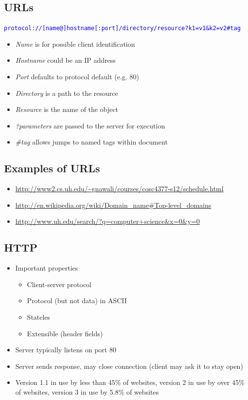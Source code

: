 \subsection{URLs}
\textcolor{blue}{\texttt{protocol://[name@]hostname[:port]/directory/resource?k1=v1\&k2=v2\#tag}}
\begin{itemize}[nosep]
    \item \emph{Name} is for possible client identification
    \item \emph{Hostname} could be an IP address
    \item \emph{Port} defaults to protocol default (e.g. 80)
    \item \emph{Directory} is a path to the resource
    \item \emph{Resource} is the name of the object
    \item \emph{?parameters} are passed to the server for execution
    \item \emph{\#tag} allows jumps to named tags within document
\end{itemize}
\subsection{Examples of URLs}
\begin{itemize}[nosep]
    \item \url{http://www2.cs.uh.edu/~gnawali/courses/cosc4377-s12/schedule.html}
    \item \url{http://en.wikipedia.org/wiki/Domain_name#Top-level_domains}
    \item \url{http://www.uh.edu/search/?q=computer+science&x=0&y=0}
\end{itemize}
\subsection{HTTP}
\begin{itemize}[nosep]
    \item Important properties
          \begin{itemize}[nosep]
              \item Client-server protocol
              \item Protocol (but not data) in ASCII
              \item Stateles
              \item Extensible (header fields)
          \end{itemize}
    \item Server typically listens on port 80
    \item Server sends response, may close connection (client may ask it to stay open)
    \item Version 1.1 in use by less than 45\% of websites, version 2 in use by over 45\% of websites, version 3 in use by 5.8\% of websites
\end{itemize}
